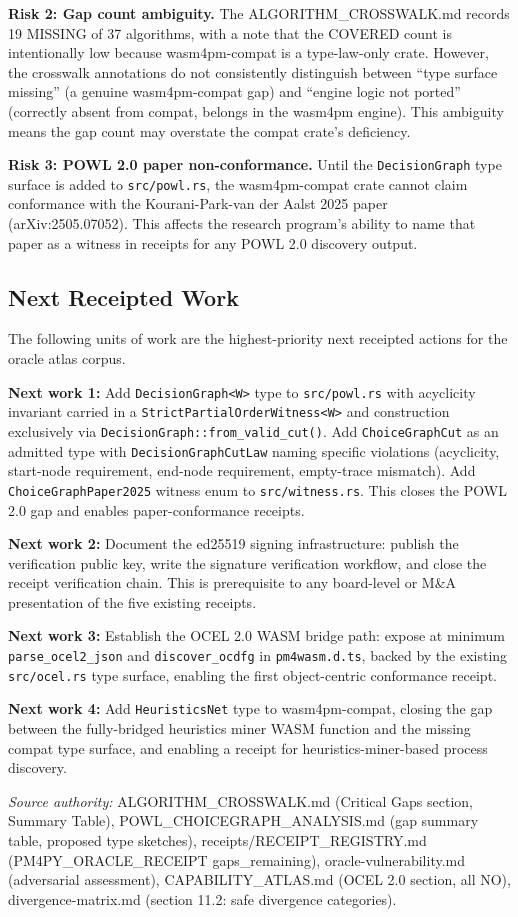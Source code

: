 \textbf{Risk 2: Gap count ambiguity.} The ALGORITHM\_CROSSWALK.md records 19 MISSING
of 37 algorithms, with a note that the COVERED count is intentionally low because
wasm4pm-compat is a type-law-only crate. However, the crosswalk annotations do not
consistently distinguish between ``type surface missing'' (a genuine wasm4pm-compat gap)
and ``engine logic not ported'' (correctly absent from compat, belongs in the wasm4pm
engine). This ambiguity means the gap count may overstate the compat crate's deficiency.

\textbf{Risk 3: POWL 2.0 paper non-conformance.} Until the \texttt{DecisionGraph} type
surface is added to \texttt{src/powl.rs}, the wasm4pm-compat crate cannot claim
conformance with the Kourani-Park-van der Aalst 2025 paper (arXiv:2505.07052). This
affects the research program's ability to name that paper as a witness in receipts for
any POWL 2.0 discovery output.

\subsection{Next Receipted Work}
\label{sec:sources-pm4py-open-next}

The following units of work are the highest-priority next receipted actions for the
oracle atlas corpus.

\textbf{Next work 1:} Add \texttt{DecisionGraph<W>} type to \texttt{src/powl.rs} with
acyclicity invariant carried in a \texttt{StrictPartialOrderWitness<W>} and construction
exclusively via \texttt{DecisionGraph::from\_valid\_cut()}. Add \texttt{ChoiceGraphCut}
as an admitted type with \texttt{DecisionGraphCutLaw} naming specific violations
(acyclicity, start-node requirement, end-node requirement, empty-trace mismatch). Add
\texttt{ChoiceGraphPaper2025} witness enum to \texttt{src/witness.rs}. This closes the
POWL 2.0 gap and enables paper-conformance receipts.

\textbf{Next work 2:} Document the ed25519 signing infrastructure: publish the
verification public key, write the signature verification workflow, and close the
receipt verification chain. This is prerequisite to any board-level or M\&A presentation
of the five existing receipts.

\textbf{Next work 3:} Establish the OCEL 2.0 WASM bridge path: expose at minimum
\texttt{parse\_ocel2\_json} and \texttt{discover\_ocdfg} in \texttt{pm4wasm.d.ts},
backed by the existing \texttt{src/ocel.rs} type surface, enabling the first
object-centric conformance receipt.

\textbf{Next work 4:} Add \texttt{HeuristicsNet} type to wasm4pm-compat, closing the
gap between the fully-bridged heuristics miner WASM function and the missing compat type
surface, and enabling a receipt for heuristics-miner-based process discovery.

\bigskip
\noindent\textit{Source authority:} ALGORITHM\_CROSSWALK.md (Critical Gaps section,
Summary Table), POWL\_CHOICEGRAPH\_ANALYSIS.md (gap summary table, proposed type sketches),
receipts/RECEIPT\_REGISTRY.md (PM4PY\_ORACLE\_RECEIPT gaps\_remaining), oracle-vulnerability.md
(adversarial assessment), CAPABILITY\_ATLAS.md (OCEL 2.0 section, all NO), divergence-matrix.md
(section 11.2: safe divergence categories).
